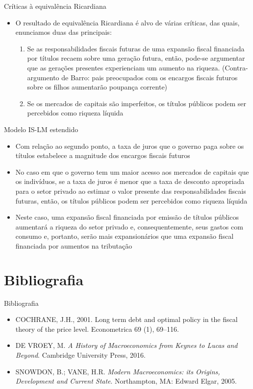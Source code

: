 \documentclass[10pt]{beamer}
\begin{document}
\begin{frame}{Críticas à equivalência Ricardiana}
    \begin{itemize}
        \item O resultado de equivalência Ricardiana é alvo de várias críticas, das quais, enunciamos duas das principais:
        \bigskip
        \begin{enumerate}
            \item Se as responsabilidades fiscais futuras de uma expansão fiscal financiada por títulos recaem sobre uma geração futura, então, pode-se argumentar que as gerações presentes experienciam um aumento na riqueza. (Contra-argumento de Barro: pais preocupados com os encargos fiscais futuros sobre os filhos aumentarão poupança corrente)
            \bigskip
            \item Se os mercados de capitais são imperfeitos, os títulos públicos podem ser percebidos como riqueza líquida
        \end{enumerate}
    \end{itemize}
\end{frame}

\begin{frame}{Modelo IS-LM estendido}
    \begin{itemize}
        \item Com relação ao segundo ponto, a taxa de juros que o governo paga sobre os títulos estabelece a magnitude dos encargos fiscais futuros
        \bigskip
        \item No caso em que o governo tem um maior acesso aos mercados de capitais que os indivíduos, se a taxa de juros é menor que a taxa de desconto apropriada para o setor privado ao estimar o valor presente das responsabilidades fiscais futuras, então, os títulos públicos podem ser percebidos como riqueza líquida
        \bigskip
        \item Neste caso, uma expansão fiscal financiada por emissão de títulos públicos aumentará a riqueza do setor privado e, consequentemente, seus gastos com consumo e, portanto, serão mais expansionários que uma expansão fiscal financiada por aumentos na tributação
    \end{itemize}
\end{frame}

\section{Bibliografia}
\begin{frame}{ Bibliografia}
    \begin{itemize}        
        \item COCHRANE, J.H., 2001. Long term debt and optimal policy in the fiscal theory of the price level. Econometrica
        69 (1), 69–116.
        \item DE VROEY, M. \emph{A History of Macroeconomics from Keynes to Lucas and Beyond}. Cambridge University Press, 2016.\medskip
        \item SNOWDON, B.; VANE, H.R. \emph{Modern Macroeconomics: its Origins, Development and Current State}. Northampton, MA: Edward Elgar, 2005.
    \end{itemize}
\end{frame}
\end{document}
